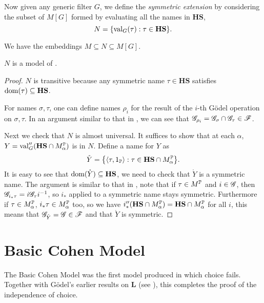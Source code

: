 \begin{definition}
    Now given any generic filter \(G\), we define the \emph{symmetric extension}
    by considering the subset of \(M[G]\) formed by evaluating all the names in \(\mathbf{HS}\),
    \[ N = \set{ \val_G(\tau): \tau\in \mathbf{HS} }. \]
\end{definition}
\begin{observation}
    We have the embeddings \(M \subseteq N \subseteq M[G]\).
\end{observation}

\begin{theorem}
    \(N\) is a model of \ZF.
\end{theorem}
\begin{proof}
    \(N\) is transitive because any symmetric name \(\tau\in \mathbf{HS}\) satisfies \(\dom(\tau)\subseteq \mathbf{HS}\).

    For names \(\sigma,\tau\), one can define names \(\rho_i\) for the result of the \(i\)-th Gödel operation on \(\sigma, \tau\).
    In an argument similar to that in , we can see that \(\G_{\rho_i} = \G_\sigma \cap \G_\tau \in \mathscr{F}\).

    Next we check that \(N\) is almost universal.
    It suffices to show that at each \(\alpha\), \(Y = \val_G''(\mathbf{HS} \cap M^\P_\alpha)\) is in \(N\).
    Define a name for \(Y\) as
    \[ \mathring{Y} = \set{ \Angle{\tau,1_\P}: \tau\in \mathbf{HS} \cap  M^\P_\alpha }. \]
    It is easy to see that \(\dom(\mathring{Y}) \subseteq \mathbf{HS}\), we need to check that \(\mathring{Y}\) is a symmetric name.
    The argument is similar to that in ,
    note that if \(\tau\in M^\P\) and \(i\in\G\), then \(\G_{i_* \tau} = i \G_\tau i^{-1}\),
    so \(i_*\) applied to a symmetric name stays symmetric.
    Furthermore if \(\tau\in M^\P_\alpha\), \(i_* \tau\in M^\P_\alpha\) too,
    so we have \(i_*''(\mathbf{HS} \cap  M^\P_\alpha) = \mathbf{HS} \cap  M^\P_\alpha \) for all \(i\),
    this means that \(\G_{\mathring{Y}} = \G \in \mathscr{F}\) and that \(\mathring{Y}\) is symmetric.
\end{proof}

\section{Basic Cohen Model}

\newcommand*{\Fn}{\operatorname{\mathsf{Fn}}}
The Basic Cohen Model was the first model produced in which choice fails.
Together with Gödel's earlier results on \(\mathbf{L}\) (see ),
this completes the proof of the independence of choice.


